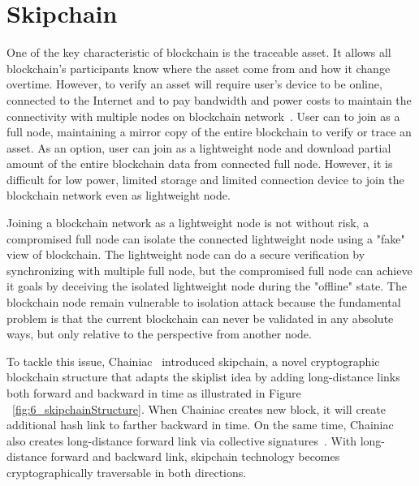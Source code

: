 \section{Skipchain}
\label{sec:4_Skipchain}
One of the key characteristic of blockchain is the traceable asset. It allows all blockchain's participants know where the asset come from and how it change overtime. However, to verify an asset will require user's device to be online, connected to the Internet and to pay bandwidth and power costs to maintain the connectivity with multiple nodes on blockchain network~\cite{Skipchain}. User can to join as a full node, maintaining a mirror copy of the entire blockchain to verify or trace an asset. As an option, user can join as a lightweight node and download partial amount of the entire blockchain data from connected full node. However, it is difficult for low power, limited storage and limited connection device to join the blockchain network even as lightweight node.

Joining a blockchain network as a lightweight node is not without risk, a compromised full node can isolate the connected lightweight node using a "fake" view of blockchain. The lightweight node can do a secure verification by synchronizing with multiple full node, but the compromised full node can achieve it goals by deceiving the isolated lightweight node during the "offline" state. The blockchain node remain vulnerable to isolation attack because the fundamental problem is that the current blockchain can never be validated in any absolute ways, but only relative to the perspective from another node.

To tackle this issue, Chainiac~\cite{chainiac} introduced skipchain, a novel cryptographic blockchain structure that adapts the skiplist idea by adding long-distance links both forward and backward in time as illustrated in Figure ~\ref{fig:6_skipchainStructure}. When Chainiac creates new block, it will create additional hash link to farther backward in time. On the same time, Chainiac also creates long-distance forward link via collective signatures~\cite{cosigning}. With long-distance forward and backward link, skipchain technology becomes cryptographically traversable in both directions. 

